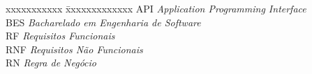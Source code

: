 \ifx\isenglish\undefined
{}
\else
{}
\fi


\begin{tabbing}
xxxxxxxxxxx \= xxxxxxxxxxxxx \kill
\textsc{API}            \> \textit{Application Programming Interface}\\

\textsc{BES}            \> \textit{Bacharelado em Engenharia de Software}\\

\textsc{RF}             \> \textit{Requisitos Funcionais}\\

\textsc{RNF}            \> \textit{Requisitos Não Funcionais}\\

\textsc{RN}            \> \textit{Regra de Negócio}


\end{tabbing}

